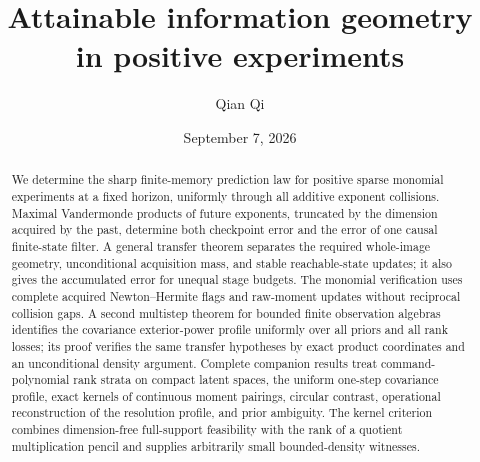 \documentclass[11pt]{amsart}
\title[Attainable information geometry]{Attainable information geometry\\ in positive experiments}
\author{Qian Qi}
\date{September 7, 2026}
\theoremstyle{definition}\newtheorem{definition}[theorem]{Definition}
\theoremstyle{remark}\newtheorem{remark}[theorem]{Remark}
\begin{document}
\begin{abstract}
We determine the sharp finite-memory prediction law for positive sparse
monomial experiments at a fixed horizon, uniformly through all additive
exponent collisions. Maximal Vandermonde products of future exponents,
truncated by the dimension acquired by the past, determine both
checkpoint error and the error of one causal finite-state filter.
A general transfer theorem separates the required whole-image geometry,
unconditional acquisition mass, and stable reachable-state updates; it
also gives the accumulated error for unequal stage budgets. The monomial
verification uses complete acquired Newton--Hermite flags and raw-moment
updates without reciprocal collision gaps. A second multistep theorem
for bounded finite observation algebras identifies the covariance
exterior-power profile uniformly over all priors and all rank losses;
its proof verifies the same transfer hypotheses by exact product
coordinates and an unconditional density argument. Complete companion results
treat command-polynomial rank strata on compact latent spaces, the
uniform one-step covariance profile, exact kernels of continuous moment
pairings, circular contrast, operational reconstruction of the resolution
profile, and prior ambiguity. The kernel criterion combines dimension-free
full-support feasibility with the rank of a quotient multiplication
pencil and supplies arbitrarily small bounded-density witnesses.
\end{abstract}
\maketitle












\appendix
\end{document}
